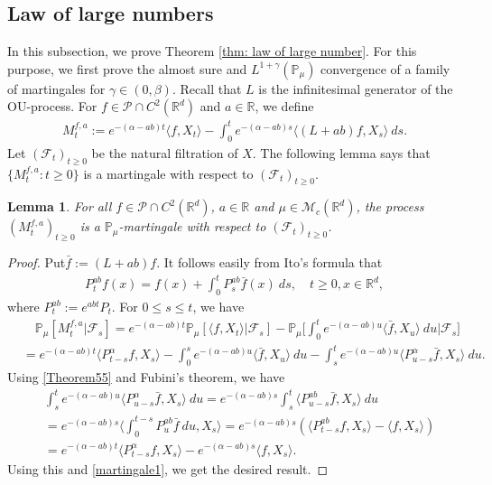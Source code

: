 \documentclass[12pt,a4paper]{amsart}
\theoremstyle{plain}
\newtheorem{lem}[thm]{Lemma}
\theoremstyle{definition}
\numberwithin{equation}{section}
\begin{document}
\subsection{Law of large numbers}
\label{sec: large rate lln}

In this subsection, we prove Theorem \ref{thm: law of large number}.
For this purpose, we first prove the almost sure and $L^{1+\gamma}(\mathbb{P}_{\mu})$ convergence of a family of martingales for $\gamma\in (0, \beta)$. Recall that $L$ is the infinitesimal generator of the OU-process.  For $f\in \mathcal{P}\cap C^2(\mathbb R^d)$ and  $a\in \mathbb R$, we define
\begin{align}
  \label{defmartingale}
  M_t^{f,a}
  :=e^{-(\alpha-ab)t}\langle f,X_t\rangle-\int_0^t e^{-(\alpha-ab)s}\langle (L+ab)f, X_s\rangle~ ds.
\end{align}
Let $(\mathscr{F}_t)_{t\geq 0}$ be the natural filtration of $X$.  The following lemma says that $\{M_t^{f,a}: t\geq 0\}$ is a martingale with respect to $(\mathscr{F}_t)_{t\geq 0}$.

\begin{lem}
  \label{lemma25}
  For all $f\in \mathcal{P}\cap C^2(\mathbb R^d)$, $a\in \mathbb R$ and $\mu\in \mathcal M_c(\mathbb R^d)$, the process $(M_t^{f,a})_{t\geq 0}$ is a $\mathbb P_\mu$-martingale with respect to $(\mathscr F_t)_{t\geq 0}$.
\end{lem}

\begin{proof}
  Put$\bar{f} :=(L+ab)f$.
  It follows easily from Ito's formula that
  \begin{align}
    \label{Theorem55}
    P_t^{ab}f(x)
    = f(x)+\int_0^t P_s^{ab}\bar{f}(x)~ds,\quad t\geq 0,x\in \mathbb R^d,
  \end{align}
  where $P_t^{ab} := e^{abt}P_t$.
  For $0\leq s\leq t$, we have
  \begin{align}
    \label{martingale1}
    & \quad\mathbb{P}_{\mu}[M_t^{f,a}|\mathscr{F}_s]
    =e^{-(\alpha-ab)t}\mathbb{P}_{\mu}\left[\langle f,X_t\rangle|\mathscr{F}_s\right]-\mathbb{P}_{\mu}\Big[\int_0^t e^{-(\alpha-ab)u}\langle \bar{f}, X_u\rangle~ du\Big|\mathscr{F}_s\big] \\
    & =e^{-(\alpha-ab)t}\langle P_{t-s}^{\alpha}f, X_s\rangle-\int_0^s e^{-(\alpha-ab)u}\langle \bar{f}, X_u\rangle~ du - \int_s^t e^{-(\alpha-ab)u}\langle P_{u-s}^{\alpha} \bar{f},X_s\rangle~ du.
  \end{align}
  Using \eqref{Theorem55} and Fubini's theorem, we have
  \begin{align}
    & \int_s^t e^{-(\alpha-ab)u}\langle P_{u-s}^{\alpha} \bar{f},X_s\rangle~ du=e^{-(\alpha-ab)s}\int_s^t\langle P_{u-s}^{ab}\bar{f},X_s\rangle~du\\
    & = e^{ - ( \alpha - ab ) s } \Big \langle \int_0^{t-s} P_{u}^{ab} \bar{f}~ du, X_s \Big \rangle
      = e^{-(\alpha-ab)s}\left(\langle P_{t-s}^{ab}f,X_s\rangle - \langle f, X_s \rangle \right) \\
    & = e^{-(\alpha-ab)t}\langle P_{t-s}^{\alpha}f, X_s\rangle - e^{ - ( \alpha - ab ) s} \langle f,X_s\rangle.
  \end{align}
  Using this and \eqref{martingale1}, we get the desired result.
\end{proof}
\end{document}
